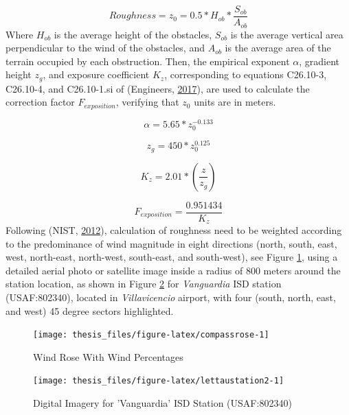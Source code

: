 \documentclass[12pt,oneside]{reedthesis}
\begin{document}
\[
Roughness = z_0= 0.5 * H_{ob}*\frac{S_{ob}}{A_{ob}}
\]
Where \(H_{ob}\) is the average height of the obstacles, \(S_{ob}\) is the average vertical area perpendicular to the wind of the obstacles, and \(A_{ob}\) is the average area of the terrain occupied by each obstruction. Then, the empirical exponent \(\alpha\), gradient height \(z_g\), and exposure coefficient \(K_z\), corresponding to equations C26.10-3, C26.10-4, and C26.10-1.si of (Engineers, \protect\hyperlink{ref-Asce2017}{2017}), are used to calculate the correction factor \(F_{exposition}\), verifying that \(z_0\) units are in meters.

\[
\alpha =  5.65*z_0^{-0.133}
\]

\[
z_g=450*z_0^{0.125}
\]

\[
K_z= 2.01*\left(\frac{z}{z_g}\right)
\]

\[
F_{exposition} = \frac{0.951434}{K_z}
\]
Following (NIST, \protect\hyperlink{ref-nist2012}{2012}), calculation of roughness need to be weighted according to the predominance of wind magnitude in eight directions (north, south, east, west, north-east, north-west, south-east, and south-west), see Figure \ref{fig:compassrose}, using a detailed aerial photo or satellite image inside a radius of 800 meters around the station location, as shown in Figure \ref{fig:lettaustation2} for \emph{Vanguardia} ISD station (USAF:802340), located in \emph{Villavicencio} airport, with four (south, north, east, and west) 45 degree sectors highlighted.
\begin{figure}

{\centering \texttt{[image: thesis\_files/figure-latex/compassrose-1]} 

}

\caption{Wind Rose With Wind Percentages}\label{fig:compassrose}
\end{figure}
\footnotesize
\begin{figure}

{\centering \texttt{[image: thesis\_files/figure-latex/lettaustation2-1]} 

}

\caption{Digital Imagery for 'Vanguardia' ISD Station (USAF:802340)}\label{fig:lettaustation2}
\end{figure}
\normalsize
\end{document}
